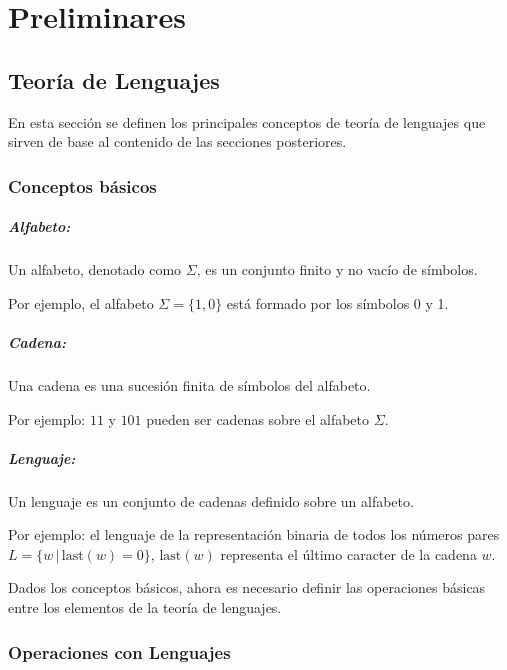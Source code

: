 
\chapter{Preliminares}
\author{Raudel Alejandro Gómez Molina}


\section{Teoría de Lenguajes}

En esta sección se definen los principales conceptos de teoría de lenguajes que sirven de base al contenido de las secciones posteriores.

\subsection{Conceptos básicos}

\paragraph{Alfabeto:} Un alfabeto, denotado como $\Sigma$, es un conjunto finito y no vacío de símbolos.

Por ejemplo, el alfabeto $\Sigma=\{1,0\}$ está formado por los símbolos 0 y 1.

\paragraph{Cadena:} Una cadena es una sucesión finita de símbolos del alfabeto.

Por ejemplo: $11$ y $101$ pueden ser cadenas sobre el alfabeto $\Sigma$.

\paragraph{Lenguaje:} Un lenguaje es un conjunto de cadenas definido sobre un alfabeto.

Por ejemplo: el lenguaje de la
representación binaria de todos los números pares $L=\{w\,|\,\text{last}(w)=0\}$, $\text{last}(w)$
representa el último caracter de la cadena $w$.

Dados los conceptos básicos, ahora es necesario definir las operaciones básicas entre los elementos de la teoría de lenguajes.

\subsection{Operaciones con Lenguajes}

